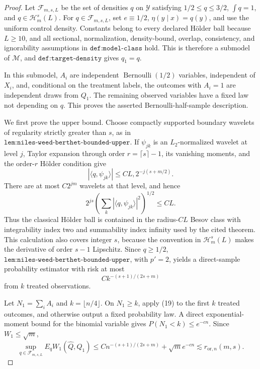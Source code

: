 \documentclass{article}
\begin{document}
\begin{proof}
Let \(\mathcal F_{m,s,L}\) be the set of densities \(q\) on \(\mathcal Y\) satisfying \(1/2\leq q\leq3/2\), \(\int q=1\), and \(q\in\mathcal H_m^s(L)\).  For \(q\in\mathcal F_{m,s,L}\), set \(e\equiv1/2\), \(\eta(y\mid x)=q(y)\), and use the uniform control density.  Constants belong to every declared Hölder ball because \(L\geq10\), and all sectional, normalization, density-bound, overlap, consistency, and ignorability assumptions in \(\texttt{def:model-class}\) hold.  This is therefore a submodel of \(\mathcal M\), and \(\texttt{def:target-density}\) gives \(q_1=q\).

In this submodel, \(A_i\) are independent \(\operatorname{Bernoulli}(1/2)\) variables, independent of \(X_i\), and, conditional on the treatment labels, the outcomes with \(A_i=1\) are independent draws from \(Q_1\).  The remaining observed variables have a fixed law not depending on \(q\).  This proves the asserted Bernoulli-half-sample description.

We first prove the upper bound.  Choose compactly supported boundary wavelets of regularity strictly greater than \(s\), as in \(\texttt{lem:niles-weed-berthet-bounded-upper}\).  If \(\psi_{jk}\) is an \(L_2\)-normalized wavelet at level \(j\), Taylor expansion through order \(r=\lceil s\rceil-1\), its vanishing moments, and the order-\(r\) Hölder condition give
\[
 |\langle q,\psi_{jk}\rangle|
 \leq C L,2^{-j(s+m/2)}.
\]
There are at most \(C2^{jm}\) wavelets at that level, and hence
\[
 2^{js}\left(\sum_k|\langle q,\psi_{jk}\rangle|^2\right)^{1/2}
 \leq CL.
 \tag{18}
\]
Thus the classical Hölder ball is contained in the radius-\(CL\) Besov class with integrability index two and summability index infinity used by the cited theorem.  This calculation also covers integer \(s\), because the convention in \(\mathcal H_m^s(L)\) makes the derivative of order \(s-1\) Lipschitz.  Since \(q\geq1/2\), \(\texttt{lem:niles-weed-berthet-bounded-upper}\), with \(p'=2\), yields a direct-sample probability estimator with risk at most
\[
 Ck^{-(s+1)/(2s+m)}
 \tag{19}
\]
from \(k\) treated observations.

Let \(N_1=\sum_iA_i\) and \(k=\lfloor n/4\rfloor\).  On \(N_1\geq k\), apply (19) to the first \(k\) treated outcomes, and otherwise output a fixed probability law.  A direct exponential-moment bound for the binomial variable gives \(P(N_1<k)\leq e^{-cn}\).  Since \(W_1\leq\sqrt m\),
\[
 \sup_{q\in\mathcal F_{m,s,L}}E_qW_1(\widehat Q,Q_1)
 \leq Cn^{-(s+1)/(2s+m)}+\sqrt m e^{-cn}
 \lesssim r_{\mathrm{or},n}(m,s).
 \tag{20}
\]


\end{proof}
\end{document}

